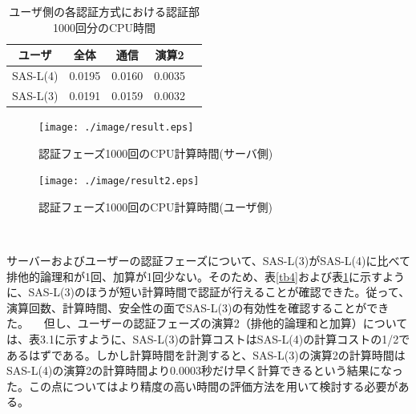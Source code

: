 \documentclass{thesis}
\begin{document}
	
	\begin{table}[H]
		\begin{center}
			\caption{ユーザ側の各認証方式における認証部1000回分のCPU時間}
			\label{tb5}
			\begin{tabular}{|c|c|c|c|c|}
				\hline
				ユーザ &全体& 通信 & 演算2\\ \hline \hline
				SAS-L(4)         & 0.0195      & 0.0160&0.0035\\ \hline
				SAS-L(3)        & 0.0191       & 0.0159&0.0032\\ \hline
			\end{tabular}
		\end{center}
	\end{table}
%
\begin{figure}[H]
 \center
 \texttt{[image: ./image/result.eps]}
 \caption{認証フェーズ1000回のCPU計算時間(サーバ側)}
 \label{4f}
\end{figure}
%
%
\begin{figure}[H]
 \center
 \texttt{[image: ./image/result2.eps]}
 \caption{認証フェーズ1000回のCPU計算時間(ユーザ側)}
 \label{5f}
\end{figure}
%


サーバーおよびユーザーの認証フェーズについて、SAS-L(3)がSAS-L(4)に比べて排他的論理和が1回、加算が1回少ない。そのため、表\ref{tb4}および表\ref{tb5}に示すように、SAS-L(3)のほうが短い計算時間で認証が行えることが確認できた。従って、演算回数、計算時間、安全性の面でSAS-L(3)の有効性を確認することができた。
　但し、ユーザーの認証フェーズの演算2（排他的論理和と加算）については、表3.1に示すように、SAS-L(3)の計算コストはSAS-L(4)の計算コストの1/2であるはずである。しかし計算時間を計測すると、SAS-L(3)の演算2の計算時間はSAS-L(4)の演算2の計算時間より0.0003秒だけ早く計算できるという結果になった。この点についてはより精度の高い時間の評価方法を用いて検討する必要がある。
	
\end{document}
